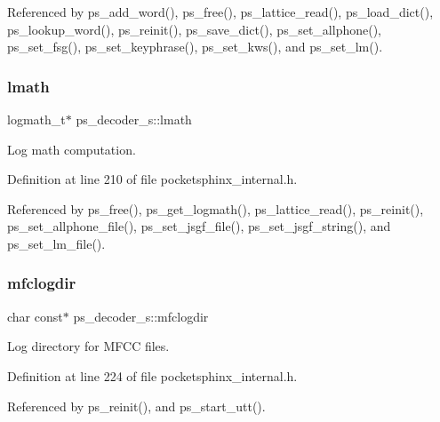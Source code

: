 Referenced by ps\+\_\+add\+\_\+word(), ps\+\_\+free(), ps\+\_\+lattice\+\_\+read(), ps\+\_\+load\+\_\+dict(), ps\+\_\+lookup\+\_\+word(), ps\+\_\+reinit(), ps\+\_\+save\+\_\+dict(), ps\+\_\+set\+\_\+allphone(), ps\+\_\+set\+\_\+fsg(), ps\+\_\+set\+\_\+keyphrase(), ps\+\_\+set\+\_\+kws(), and ps\+\_\+set\+\_\+lm().

\mbox{\label{structps__decoder__s_abd17fe329f2fb219c5a534f3217c5b95}} 
\subsubsection{lmath}
{\footnotesize\ttfamily logmath\+\_\+t$\ast$ ps\+\_\+decoder\+\_\+s\+::lmath}



Log math computation. 



Definition at line 210 of file pocketsphinx\+\_\+internal.\+h.



Referenced by ps\+\_\+free(), ps\+\_\+get\+\_\+logmath(), ps\+\_\+lattice\+\_\+read(), ps\+\_\+reinit(), ps\+\_\+set\+\_\+allphone\+\_\+file(), ps\+\_\+set\+\_\+jsgf\+\_\+file(), ps\+\_\+set\+\_\+jsgf\+\_\+string(), and ps\+\_\+set\+\_\+lm\+\_\+file().

\mbox{\label{structps__decoder__s_a8bb5ef8791798b8dd9bc82b1ec016663}} 
\subsubsection{mfclogdir}
{\footnotesize\ttfamily char const$\ast$ ps\+\_\+decoder\+\_\+s\+::mfclogdir}



Log directory for M\+F\+CC files. 



Definition at line 224 of file pocketsphinx\+\_\+internal.\+h.



Referenced by ps\+\_\+reinit(), and ps\+\_\+start\+\_\+utt().

\mbox{\label{structps__decoder__s_a2886b321c576c7def449ebb2f37899fd}} 
